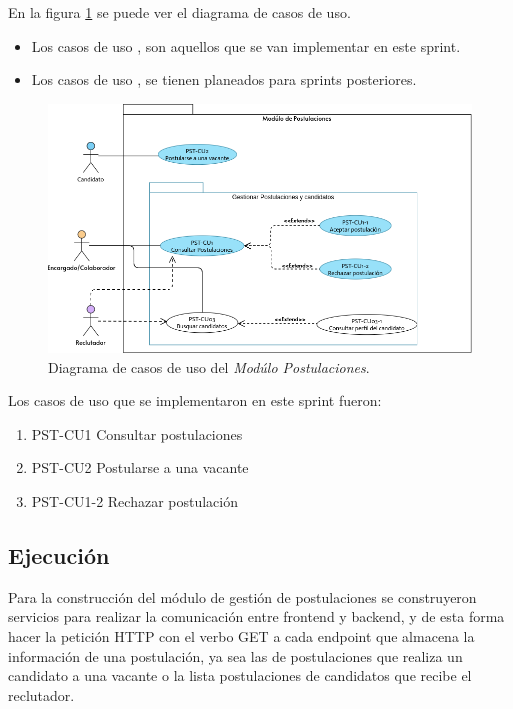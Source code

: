 En la figura \ref{dcu:DCUPST} se puede ver el diagrama de casos de uso.
\begin{itemize}
    \item Los casos de uso \IUazul{} , son aquellos que se van implementar en este sprint.
    \item Los casos de uso \IUblanco{}, se tienen planeados para sprints posteriores.
\end{itemize} 

\begin{figure}[H]
    \begin{center}
        \includegraphics[width=.7\textwidth]{sprints/imagenes/DCUPST.png}
    \end{center}
    \caption{Diagrama de casos de uso del \textit{Modúlo Postulaciones}.}
    \label{dcu:DCUPST}
\end{figure}

Los casos de uso que se implementaron en este sprint fueron:
\begin{enumerate}
    \item PST-CU1 Consultar postulaciones
    \item PST-CU2 Postularse a una vacante
    \item PST-CU1-2 Rechazar postulación
\end{enumerate} 


\subsection{Ejecución}

Para la construcción del módulo de gestión de postulaciones se construyeron servicios para realizar la comunicación entre frontend y backend, y de esta forma hacer la petición HTTP con el verbo GET a cada endpoint que almacena la información de una postulación, ya sea las de postulaciones que realiza un candidato a una vacante o la lista postulaciones de candidatos que recibe el reclutador.
